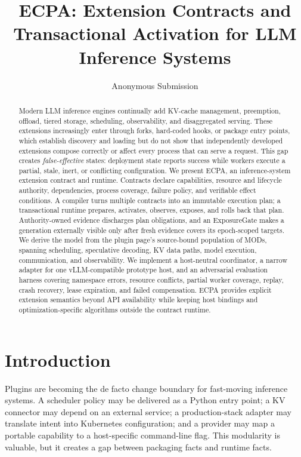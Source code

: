 \documentclass[letterpaper,twocolumn,10pt]{article}
\title{\Large \bf ECPA: Extension Contracts and Transactional Activation for LLM Inference Systems}
\author{Anonymous Submission}
\date{}
\begin{document}
\pagestyle{plain}
\maketitle

\begin{abstract}
Modern LLM inference engines continually add KV-cache management, preemption,
offload, tiered storage, scheduling, observability, and disaggregated serving.
These extensions increasingly enter through forks, hard-coded hooks, or
package entry points, which establish discovery and loading but do not show
that independently developed extensions compose correctly or affect every
process that can serve a request. This gap creates \emph{false-effective}
states: deployment state reports success while workers execute a partial,
stale, inert, or conflicting configuration. We present ECPA, an inference-system
extension contract and runtime. Contracts declare capabilities, resource and
lifecycle authority, dependencies, process coverage, failure policy, and
verifiable effect conditions. A compiler turns multiple contracts into an
immutable execution plan; a transactional runtime prepares, activates,
observes, exposes, and rolls back that plan. Authority-owned evidence discharges
plan obligations, and an ExposureGate makes a generation externally visible
only after fresh evidence covers its epoch-scoped targets. We derive the model
from the plugin page's source-bound population of \ECPAWorkshopMods{} MODs,
spanning scheduling, speculative decoding, KV data paths, model execution,
communication, and observability.  We implement a host-neutral
coordinator, a narrow adapter for one vLLM-compatible prototype host, and an
adversarial evaluation harness covering namespace errors, resource conflicts,
partial worker coverage, replay, crash recovery, lease expiration, and failed
compensation.  ECPA provides explicit extension semantics beyond API
availability while keeping host bindings and optimization-specific algorithms
outside the contract runtime.
\end{abstract}

\section{Introduction}
Plugins are becoming the de facto change boundary for fast-moving inference
systems.  A scheduler policy may be delivered as a Python entry point; a KV
connector may depend on an external service; a production-stack adapter may
translate intent into Kubernetes configuration; and a provider may map a
portable capability to a host-specific command-line flag.  This modularity is
valuable, but it creates a gap between packaging facts and runtime facts.
\end{document}

